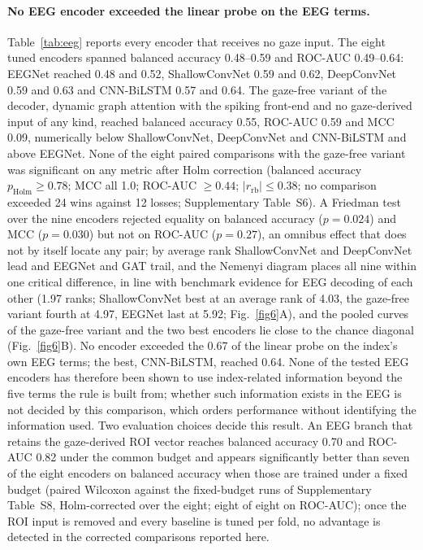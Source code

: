 \documentclass[pdflatex,sn-basic,Numbered,twocolumn,iicol]{sn-jnl}
\theoremstyle{thmstyleone}%
\theoremstyle{thmstyletwo}%
\theoremstyle{thmstylethree}%
\begin{document}
\paragraph{No EEG encoder exceeded the linear probe on the EEG terms.} Table~\ref{tab:eeg} reports every encoder that receives no gaze input. The eight tuned encoders spanned balanced accuracy 0.48--0.59 and ROC-AUC 0.49--0.64: EEGNet reached 0.48 and 0.52, ShallowConvNet 0.59 and 0.62, DeepConvNet 0.59 and 0.63 and CNN-BiLSTM 0.57 and 0.64. The gaze-free variant of the decoder, dynamic graph attention with the spiking front-end and no gaze-derived input of any kind, reached balanced accuracy 0.55, ROC-AUC 0.59 and MCC 0.09, numerically below ShallowConvNet, DeepConvNet and CNN-BiLSTM and above EEGNet. None of the eight paired comparisons with the gaze-free variant was significant on any metric after Holm correction (balanced accuracy $p_{\mathrm{Holm}}\ge0.78$; MCC all 1.0; ROC-AUC $\ge0.44$; $|r_{\mathrm{rb}}|\le0.38$; no comparison exceeded 24 wins against 12 losses; Supplementary Table~S6). A Friedman test over the nine encoders rejected equality on balanced accuracy ($p=0.024$) and MCC ($p=0.030$) but not on ROC-AUC ($p=0.27$), an omnibus effect that does not by itself locate any pair; by average rank ShallowConvNet and DeepConvNet lead and EEGNet and GAT trail, and the Nemenyi diagram places all nine within one critical difference, in line with benchmark evidence for EEG decoding \cite{ref66} of each other (1.97 ranks; ShallowConvNet best at an average rank of 4.03, the gaze-free variant fourth at 4.97, EEGNet last at 5.92; Fig.~\ref{fig6}A), and the pooled curves of the gaze-free variant and the two best encoders lie close to the chance diagonal (Fig.~\ref{fig6}B). No encoder exceeded the 0.67 of the linear probe on the index's own EEG terms; the best, CNN-BiLSTM, reached 0.64. None of the tested EEG encoders has therefore been shown to use index-related information beyond the five terms the rule is built from; whether such information exists in the EEG is not decided by this comparison, which orders performance without identifying the information used. Two evaluation choices decide this result. An EEG branch that retains the gaze-derived ROI vector reaches balanced accuracy 0.70 and ROC-AUC 0.82 under the common budget and appears significantly better than seven of the eight encoders on balanced accuracy when those are trained under a fixed budget (paired Wilcoxon against the fixed-budget runs of Supplementary Table~S8, Holm-corrected over the eight; eight of eight on ROC-AUC); once the ROI input is removed and every baseline is tuned per fold, no advantage is detected in the corrected comparisons reported here.
\end{document}
